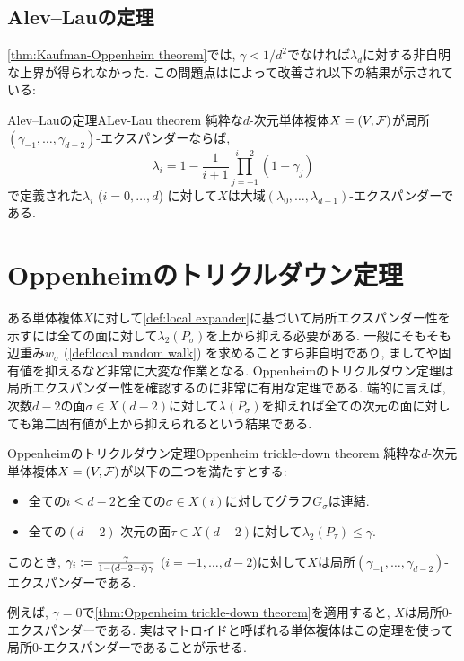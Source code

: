 \subsection{Alev--Lauの定理}
\cref{thm:Kaufman-Oppenheim theorem}では, $\gamma < 1/d^2$でなければ$\lambda_d$に対する非自明な上界が得られなかった.
この問題点は\citet{AL20}によって改善され以下の結果が示されている:
%
\begin{theorem}{Alev--Lauの定理}{ALev-Lau theorem}
    純粋な$d$-次元単体複体$X = (V,\mathcal{F})$が局所$(\gamma_{-1},\dots,\gamma_{d-2})$-エクスパンダーならば,
    \[ \lambda_i = 1-\frac{1}{i+1}\prod_{j=-1}^{i-2}(1-\gamma_j)\]
    で定義された$\lambda_i$ ($i=0,\dots,d$) に対して$X$は大域$(\lambda_0,\dots,\lambda_{d-1})$-エクスパンダーである.
\end{theorem}


\section{Oppenheimのトリクルダウン定理}
ある単体複体$X$に対して\cref{def:local expander}に基づいて局所エクスパンダー性を示すには全ての面に対して$\lambda_2(P_\sigma)$を上から抑える必要がある.
一般にそもそも辺重み$w_\sigma$ (\cref{def:local random walk}) を求めることすら非自明であり, ましてや固有値を抑えるなど非常に大変な作業となる.
Oppenheimのトリクルダウン定理は局所エクスパンダー性を確認するのに非常に有用な定理である.
端的に言えば, 次数$d-2$の面$\sigma \in X(d-2)$に対して$\lambda(P_\sigma)$を抑えれば全ての次元の面に対しても第二固有値が上から抑えられるという結果である.
\begin{theorem}{Oppenheimのトリクルダウン定理}{Oppenheim trickle-down theorem}
    純粋な$d$-次元単体複体$X = (V,\mathcal{F})$が以下の二つを満たすとする:
    \begin{itemize}
    \item 全ての$i\le d-2$と全ての$\sigma\in X(i)$に対してグラフ$G_\sigma$は連結.
    \item 全ての$(d-2)$-次元の面$\tau \in X(d-2)$に対して$\lambda_2(P_\tau) \le \gamma$.
    \end{itemize}
    このとき, $\gamma_i \mathrel{:=} \frac{\gamma}{1-(d-2-i)\gamma}$ ($i=-1,\dots,d-2$)に対して$X$は局所$(\gamma_{-1},\dots,\gamma_{d-2})$-エクスパンダーである.
\end{theorem}
例えば, $\gamma=0$で\cref{thm:Oppenheim trickle-down theorem}を適用すると, $X$は局所$0$-エクスパンダーである.
実はマトロイドと呼ばれる単体複体はこの定理を使って局所$0$-エクスパンダーであることが示せる.

